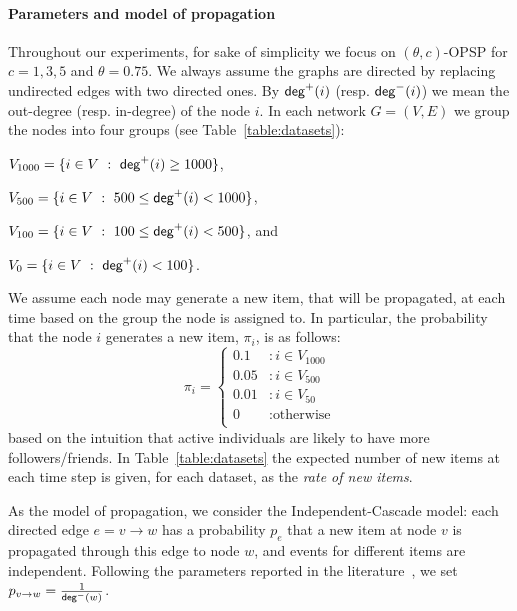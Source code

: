 \paragraph*{Parameters and model of propagation}
Throughout our experiments, for sake of simplicity we focus on $(\theta,c)$-OPSP for $c=1,3,5$ and $\theta = 0.75$. We always assume the graphs are directed by replacing undirected edges with two directed ones. By $\mathsf{deg}^+(i)$ (resp. $\mathsf{deg}^-(i)$) we mean the out-degree (resp. in-degree) of the node $i$. In each network $G=(V,E)$ we group the nodes into four groups (see Table~\ref{table:datasets}):
\begin{itemize*}
 \item $V_{1000} = \{i\in V ~:~ \mathsf{deg}^+(i) \geq 1000\}$,
 \item $V_{500}  = \{i\in V ~:~ 500\leq \mathsf{deg}^+(i) < 1000\}$,
 \item $V_{100}  = \{i\in V ~:~ 100\leq \mathsf{deg}^+(i) < 500\}$, and
 \item $V_{0}    = \{i\in V ~:~ \mathsf{deg}^+(i) < 100\}$.
\end{itemize*}
We assume each node may generate a new item, that will be propagated, at each time based on the group the node is assigned to. In particular, the probability that the node $i$ generates a new item, $\pi_i$, is as follows:
$$
   \pi_i = \left\{
     \begin{array}{ll}
       0.1 &: i \in V_{1000}\\
       0.05 &: i \in V_{500} \\       
       0.01 &: i \in V_{50} \\
       0 & : \text{otherwise} \\
     \end{array}
   \right.
$$
based on the intuition that active individuals are  likely to have more followers/friends. In Table~\ref{table:datasets} the expected number of new items at each time step is given, for each dataset, as the \emph{rate of new items}.



As the model of propagation, we consider the Independent-Cascade model\cite{Kempe2003}:  each directed edge $e=v\rightarrow w$ has a probability $p_e$ that a new item at node $v$ is propagated through this edge to node $w$, and events for different items are independent. Following the parameters reported in the literature~\cite{Kempe2003,Chen2009,Chen2010,jung2011irie,tang2014influence}, we set $p_{v\rightarrow w} = \frac{1}{\mathsf{deg}^-(w)}$.



